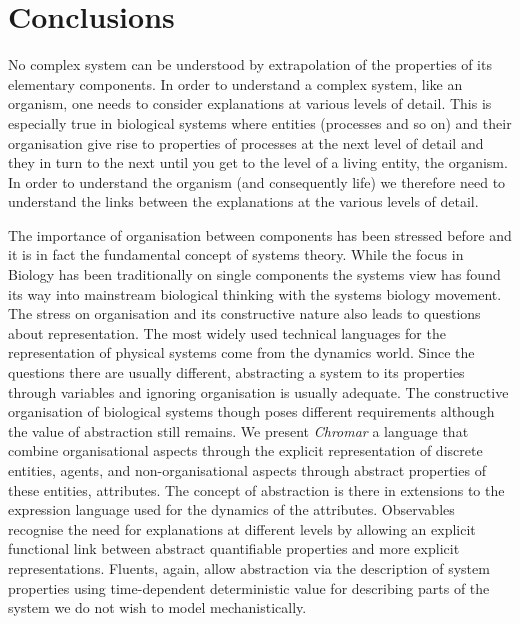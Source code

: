 \documentclass[phd]{infthesis}
\begin{document}
\chapter{Conclusions}
No complex system can be understood by extrapolation of the properties of its
elementary components. In order to understand a complex system, like an
organism, one needs to consider explanations at various levels of detail. This
is especially true in biological systems where entities (processes and so on)
and their organisation give rise to properties of processes at the next level of
detail and they in turn to the next until you get to the level of a living
entity, the organism. In order to understand the organism (and consequently
life) we therefore need to understand the links between the explanations at the
various levels of detail.

The importance of organisation between components has been stressed before and
it is in fact the fundamental concept of systems theory. While the focus in
Biology has been traditionally on single components the systems view has found
its way into mainstream biological thinking with the systems biology
movement. The stress on organisation and its constructive nature also leads to
questions about representation. The most widely used technical languages for the
representation of physical systems come from the dynamics world. Since the
questions there are usually different, abstracting a system to its properties
through variables and ignoring organisation is usually adequate. The
constructive organisation of biological systems though poses different
requirements although the value of abstraction still remains. We present
\emph{Chromar} a language that combine organisational aspects through the
explicit representation of discrete entities, agents, and non-organisational
aspects through abstract properties of these entities, attributes. The concept
of abstraction is there in extensions to the expression language used for the
dynamics of the attributes. Observables recognise the need for explanations at
different levels by allowing an explicit functional link between abstract
quantifiable properties and more explicit representations. Fluents, again, allow
abstraction via the description of system properties using time-dependent
deterministic value for describing parts of the system we do not wish to model
mechanistically.
\end{document}
